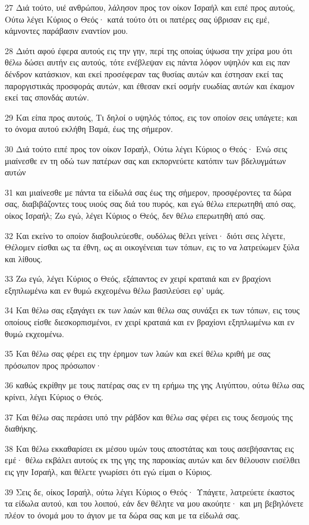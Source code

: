 \par 27 Διά τούτο, υιέ ανθρώπου, λάλησον προς τον οίκον Ισραήλ και ειπέ προς αυτούς, Ούτω λέγει Κύριος ο Θεός· κατά τούτο ότι οι πατέρες σας ύβρισαν εις εμέ, κάμνοντες παράβασιν εναντίον μου.
\par 28 Διότι αφού έφερα αυτούς εις την γην, περί της οποίας ύψωσα την χείρα μου ότι θέλω δώσει αυτήν εις αυτούς, τότε ενέβλεψαν εις πάντα λόφον υψηλόν και εις παν δένδρον κατάσκιον, και εκεί προσέφεραν τας θυσίας αυτών και έστησαν εκεί τας παροργιστικάς προσφοράς αυτών, και έθεσαν εκεί οσμήν ευωδίας αυτών και έκαμον εκεί τας σπονδάς αυτών.
\par 29 Και είπα προς αυτούς, Τι δηλοί ο υψηλός τόπος, εις τον οποίον σεις υπάγετε; και το όνομα αυτού εκλήθη Βαμά, έως της σήμερον.
\par 30 Διά τούτο ειπέ προς τον οίκον Ισραήλ, Ούτω λέγει Κύριος ο Θεός· Ενώ σεις μιαίνεσθε εν τη οδώ των πατέρων σας και εκπορνεύετε κατόπιν των βδελυγμάτων αυτών
\par 31 και μιαίνεσθε με πάντα τα είδωλά σας έως της σήμερον, προσφέροντες τα δώρα σας, διαβιβάζοντες τους υιούς σας διά του πυρός, και εγώ θέλω επερωτηθή από σας, οίκος Ισραήλ; Ζω εγώ, λέγει Κύριος ο Θεός, δεν θέλω επερωτηθή από σας.
\par 32 Και εκείνο το οποίον διαβουλεύεσθε, ουδόλως θέλει γείνει· διότι σεις λέγετε, Θέλομεν είσθαι ως τα έθνη, ως αι οικογένειαι των τόπων, εις το να λατρεύωμεν ξύλα και λίθους.
\par 33 Ζω εγώ, λέγει Κύριος ο Θεός, εξάπαντος εν χειρί κραταιά και εν βραχίονι εξηπλωμένω και εν θυμώ εκχεομένω θέλω βασιλεύσει εφ' υμάς.
\par 34 Και θέλω σας εξαγάγει εκ των λαών και θέλω σας συνάξει εκ των τόπων, εις τους οποίους είσθε διεσκορπισμένοι, εν χειρί κραταιά και εν βραχίονι εξηπλωμένω και εν θυμώ εκχεομένω.
\par 35 Και θέλω σας φέρει εις την έρημον των λαών και εκεί θέλω κριθή με σας πρόσωπον προς πρόσωπον·
\par 36 καθώς εκρίθην με τους πατέρας σας εν τη ερήμω της γης Αιγύπτου, ούτω θέλω σας κρίνει, λέγει Κύριος ο Θεός.
\par 37 Και θέλω σας περάσει υπό την ράβδον και θέλω σας φέρει εις τους δεσμούς της διαθήκης.
\par 38 Και θέλω εκκαθαρίσει εκ μέσου υμών τους αποστάτας και τους ασεβήσαντας εις εμέ· θέλω εκβάλει αυτούς εκ της γης της παροικίας αυτών και δεν θέλουσιν εισέλθει εις γην Ισραήλ, και θέλετε γνωρίσει ότι εγώ είμαι ο Κύριος.
\par 39 Σεις δε, οίκος Ισραήλ, ούτω λέγει Κύριος ο Θεός· Υπάγετε, λατρεύετε έκαστος τα είδωλα αυτού, και του λοιπού, εάν δεν θέλητε να μου ακούητε· και μη βεβηλόνετε πλέον το όνομά μου το άγιον με τα δώρα σας και με τα είδωλά σας.
